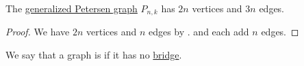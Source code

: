 \begin{proposition}\label{thm:petersen_graph_cardinality}
  The \hyperref[def:petersen_graph]{generalized Petersen graph} \( P_{n,k} \) has \( 2n \) vertices and \( 3n \) edges.
\end{proposition}
\begin{proof}
  We have \( 2n \) vertices and \( n \) edges by .  and  each add \( n \) edges.
\end{proof}

\begin{definition}\label{def:bridgeless_graph}\mimprovised
  We say that a graph is  if it has no \hyperref[def:graph_bridge]{bridge}.
\end{definition}

